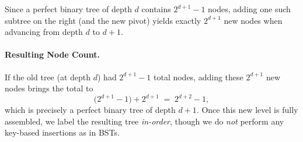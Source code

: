 \documentclass[11pt]{article}
\theoremstyle{definition}
\theoremstyle{remark}
\begin{document}
Since a perfect binary tree of depth $d$ contains $2^{d+1}-1$ nodes, 
adding one such subtree on the right (and the new pivot) yields exactly $2^{d+1}$ new nodes 
when advancing from depth $d$ to $d+1$. 

\paragraph{Resulting Node Count.}
If the old tree (at depth $d$) had $2^{d+1}-1$ total nodes, adding these $2^{d+1}$ new nodes 
brings the total to
\[
  \bigl(2^{d+1}-1\bigr) + 2^{d+1} 
  \;=\;
  2^{d+2}-1,
\]
which is precisely a perfect binary tree of depth $d+1$. Once this new level is fully assembled,
we label the resulting tree \emph{in-order}, though we do \emph{not} perform any 
key-based insertions as in BSTs.
\end{document}
